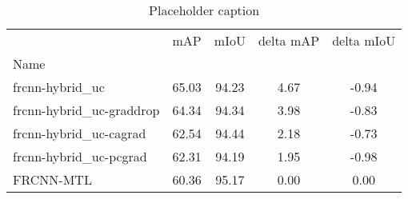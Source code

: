 \begin{table}[htbp]
\centering
\caption{Placeholder caption}
\label{tab:uc-grad}
\begin{tabular}{lcccc}
\toprule
 & mAP & mIoU & delta mAP & delta mIoU \\
Name &  &  &  &  \\
\midrule
frcnn-hybrid_uc & 65.03 & 94.23 & 4.67 & -0.94 \\
frcnn-hybrid_uc-graddrop & 64.34 & 94.34 & 3.98 & -0.83 \\
frcnn-hybrid_uc-cagrad & 62.54 & 94.44 & 2.18 & -0.73 \\
frcnn-hybrid_uc-pcgrad & 62.31 & 94.19 & 1.95 & -0.98 \\
FRCNN-MTL & 60.36 & 95.17 & 0.00 & 0.00 \\
\bottomrule
\end{tabular}
\end{table}
